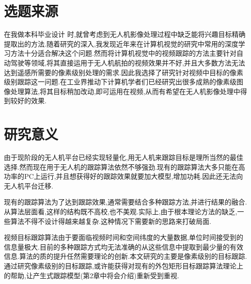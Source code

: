 \section{选题来源}
在我做本科毕业设计
\supercite{benchme}
时,就曾考虑到无人机影像处理过程中缺乏能将兴趣目标精确提取出的方法.随着研究的深入,我发现近年来在计算机视觉的研究中常用的深度学习方法十分适合解决这个问题.然而将计算机视觉中的视频跟踪的方法主要针对自动驾驶等领域,将其直接运用于无人机航拍的视频效果并不好,并且大多数方法无法达到遥感所需要的像素级别处理的需求.因此我选择了研究针对视频中目标的像素级别跟踪这一问题.在工业界推动下计算机学者们已经研究出很多成熟的像素级图像处理算法,将其目标稍加改动,即可运用在视频,从而有希望在无人机影像处理中得到较好的效果.

\section{研究意义}
由于现阶段的无人机平台已经实现轻量化,用无人机来跟踪目标是理所当然的最佳选择.然而现在用于无人机的跟踪算法依然不够强劲.现有的跟踪算法大多只能在高功率的PC上运行,并且想获得好的跟踪效果就要加大模型,增加功耗.因此还无法向无人机平台迁移.
\par
现有的跟踪算法为了达到跟踪效果,通常需要结合多种跟踪方法,并进行结果的融合.从算法层面看,这样的结构既不高校,也不美观.实际上,由于根本理论方法的缺乏,一些算法不得不设计得越来越复杂.这种情况下需要新的思路来打破局面.
\par
视频目标跟踪算法由于要面临视频时间和空间纬度的大量数据,单位时间接受到的信息量极大.目前的多种跟踪方式均无法准确的从这些信息中提取到最少量的有效信息.算法的质的提升任然需要理论的创新.本文研究的主要是像素级别的目标跟踪.通过研究像素级别的目标跟踪,或许能获得对现有的外包矩形目标跟踪算法理论上的帮助,让产生式跟踪模型(第2章中将会介绍)重新受到重视.

